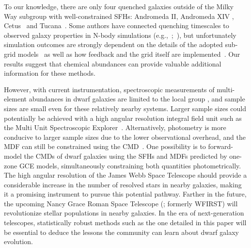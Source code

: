 To our knowledge, there are only four quenched galaxies outside of the Milky
Way subgroup with well-constrained SFHs: Andromeda II, Andromeda XIV
\citep{Weisz2014a}, Cetus~\citep{Monelli2010a} and Tucana~\citep{Monelli2010b}.
Some authors have connected quenching timescales to observed galaxy properties
in N-body simulations (e.g.,~\citealp*{Rocha2012};~\citealp{Slater2013,
Slater2014, Phillips2014, Phillips2015, Wheeler2014}), but unfortunately
simulation outcomes are strongly dependent on the details of the adopted
sub-grid models~\citep[e.g.,][]{Li2020} as well as how feedback and the grid
itself are implemented~\citep{Hu2022}.
Our results suggest that chemical abundances can provide valuable additional
information for these methods.
\par
However, with current instrumentation, spectroscopic measurements of
multi-element abundances in dwarf galaxies are limited to the local group
\citep[e.g.,][]{Kirby2011, Kirby2020}, and sample sizes are small even for
these relatively nearby systems.
Larger sample sizes could potentially be achieved with a high
angular resolution integral field unit such as the Multi Unit Spectroscopic
Explorer~\citep[MUSE;][]{Bacon2014}.
Alternatively, photometry is more conducive to larger sample sizes due to the
lower observational overhead, and the MDF can still be constrained using the
CMD~\citep[e.g.,][]{Lianou2011}.
One possibility is to forward-model the CMDs of dwarf galaxies using the SFHs
and MDFs predicted by one-zone GCE models, simultaneously constraining both
quantities photometrically.
The high angular resolution of the James Webb Space Telescope
\citep[JWST;][]{Gardner2006} should provide a considerable increase in the
number of resolved stars in nearby galaxies, making it a promising instrument
to pursue this potential pathway.
Farther in the future, the upcoming Nancy Grace Roman Space Telescope
(\citealp{Spergel2013, Spergel2015}; formerly WFIRST) will revolutionize
stellar populations in nearby galaxies.
In the era of next-generation telescopes, statistically robust methods such as
the one detailed in this paper will be essential to deduce the lessons the
community can learn about dwarf galaxy evolution.

